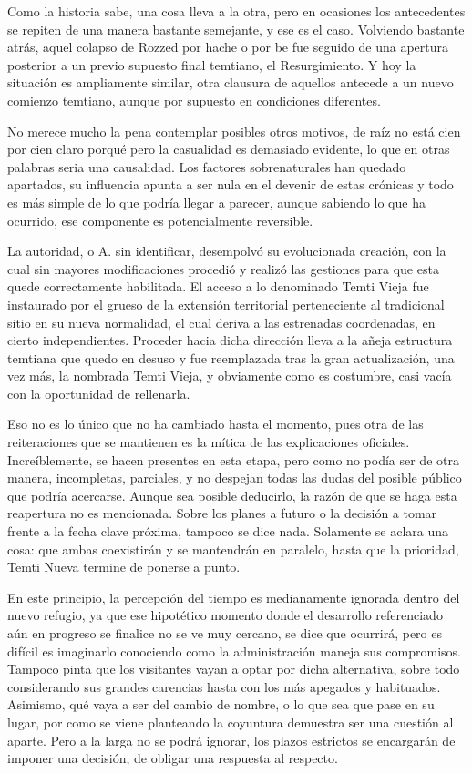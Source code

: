 \documentclass[
  spanish,
]{book}
\begin{document}
Como la historia sabe, una cosa lleva a la otra, pero en ocasiones los antecedentes se repiten de una manera bastante semejante, y ese es el caso. Volviendo bastante atrás, aquel colapso de Rozzed por hache o por be fue seguido de una apertura posterior a un previo supuesto final temtiano, el Resurgimiento. Y hoy la situación es ampliamente similar, otra clausura de aquellos antecede a un nuevo comienzo temtiano, aunque por supuesto en condiciones diferentes.

No merece mucho la pena contemplar posibles otros motivos, de raíz no está cien por cien claro porqué pero la casualidad es demasiado evidente, lo que en otras palabras seria una causalidad. Los factores sobrenaturales han quedado apartados, su influencia apunta a ser nula en el devenir de estas crónicas y todo es más simple de lo que podría llegar a parecer, aunque sabiendo lo que ha ocurrido, ese componente es potencialmente reversible.

La autoridad, o A. sin identificar, desempolvó su evolucionada creación, con la cual sin mayores modificaciones procedió y realizó las gestiones para que esta quede correctamente habilitada. El acceso a lo denominado Temti Vieja fue instaurado por el grueso de la extensión territorial perteneciente al tradicional sitio en su nueva normalidad, el cual deriva a las estrenadas coordenadas, en cierto independientes. Proceder hacia dicha dirección lleva a la añeja estructura temtiana que quedo en desuso y fue reemplazada tras la gran actualización, una vez más, la nombrada Temti Vieja, y obviamente como es costumbre, casi vacía con la oportunidad de rellenarla.

Eso no es lo único que no ha cambiado hasta el momento, pues otra de las reiteraciones que se mantienen es la mítica de las explicaciones oficiales. Increíblemente, se hacen presentes en esta etapa, pero como no podía ser de otra manera, incompletas, parciales, y no despejan todas las dudas del posible público que podría acercarse. Aunque sea posible deducirlo, la razón de que se haga esta reapertura no es mencionada. Sobre los planes a futuro o la decisión a tomar frente a la fecha clave próxima, tampoco se dice nada. Solamente se aclara una cosa: que ambas coexistirán y se mantendrán en paralelo, hasta que la prioridad, Temti Nueva termine de ponerse a punto.

En este principio, la percepción del tiempo es medianamente ignorada dentro del nuevo refugio, ya que ese hipotético momento donde el desarrollo referenciado aún en progreso se finalice no se ve muy cercano, se dice que ocurrirá, pero es difícil es imaginarlo conociendo como la administración maneja sus compromisos. Tampoco pinta que los visitantes vayan a optar por dicha alternativa, sobre todo considerando sus grandes carencias hasta con los más apegados y habituados. Asimismo, qué vaya a ser del cambio de nombre, o lo que sea que pase en su lugar, por como se viene planteando la coyuntura demuestra ser una cuestión al aparte. Pero a la larga no se podrá ignorar, los plazos estrictos se encargarán de imponer una decisión, de obligar una respuesta al respecto.
\end{document}
